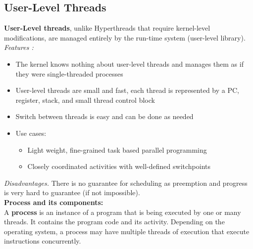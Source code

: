\documentclass[12pt, a4paper]{report}
\begin{document}
\subsection{User-Level Threads}
{\bfseries{User-Level threads}}, unlike Hyperthreads that require kernel-level modifications, are managed entirely by the
run-time system (user-level library).\\
{\textit{Features :}}
\begin{itemize}
    \item The kernel knows nothing about user-level threads and manages them as if they were single-threaded processes
    \item User-level threads are small and fast, each thread is represented by a PC, register, stack, and small thread
          control block
    \item Switch between threads is easy and can be done as needed
    \item Use cases:
            \begin{itemize}
                \item Light weight, fine-grained task based parallel programming 
                \item Closely coordinated activities with well-defined switchpoints
            \end{itemize}
\end{itemize}

{\textit{Disadvantages.}} There is no guarantee for scheduling as preemption and progress is very hard to guarantee (if 
not impossible).\\

{\large{\bfseries{Process and its components:}}}\\
A {\bfseries process} is an instance of a program that is being executed by one or many threads. It contains the program
code and its activity. Depending on the operating system, a process may have multiple threads of execution that execute 
instructions concurrently.
\end{document}

